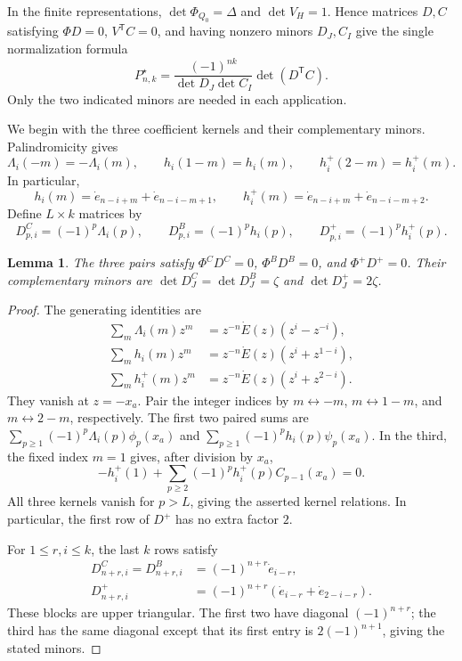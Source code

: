 \documentclass[12pt]{article}
\newtheorem{lemma}[theorem]{Lemma}
\numberwithin{equation}{section}
\newcommand{\dote}{\dot e}
\newcommand{\dotE}{\dot E}
\newcommand{\ph}{\phi}
\newcommand{\ps}{\psi}
\begin{document}
In the finite representations, $\det\Phi_{Q_0}=\Delta$ and
$\det V_H=1$.  Hence matrices $D,C$ satisfying
$\Phi D=0$, $V^{\mathsf T}C=0$, and having nonzero minors $D_J,C_I$
give the single normalization formula
\begin{equation}\label{eq:normalized-transfer}
 P^\star_{n,k}
 =\frac{(-1)^{nk}}{\det D_J\det C_I}
   \det(D^{\mathsf T}C).
\end{equation}
Only the two indicated minors are needed in each application.

We begin with the three coefficient kernels and their complementary
minors.
Palindromicity gives
\begin{equation}\label{eq:coefficient-reflections}
 \Lambda_i(-m)=-\Lambda_i(m),\qquad
 h_i(1-m)=h_i(m),\qquad h_i^+(2-m)=h_i^+(m).
\end{equation}
In particular,
\[
 h_i(m)=\dote_{n-i+m}+\dote_{n-i-m+1},\qquad
 h_i^+(m)=\dote_{n-i+m}+\dote_{n-i-m+2}.
\]
Define $L\times k$ matrices by
\begin{equation}\label{eq:D}
 D^C_{p,i}=(-1)^p\Lambda_i(p),\qquad
 D^B_{p,i}=(-1)^ph_i(p),\qquad
 D^+_{p,i}=(-1)^ph_i^+(p).
\end{equation}

\begin{lemma}\label{lem:coefficient-kernels}
The three pairs satisfy $\Phi^C D^C=0$, $\Phi^B D^B=0$, and
$\Phi^+D^+=0$.  Their complementary minors are
$\det D^C_J=\det D^B_J=\zeta$ and $\det D^+_J=2\zeta$.
\end{lemma}

\begin{proof}
The generating identities are
\begin{align*}
 \sum_m\Lambda_i(m)z^m&=z^{-n}\dotE(z)(z^i-z^{-i}),\\
 \sum_m h_i(m)z^m&=z^{-n}\dotE(z)(z^i+z^{1-i}),\\
 \sum_m h_i^+(m)z^m&=z^{-n}\dotE(z)(z^i+z^{2-i}).
\end{align*}
They vanish at $z=-x_a$.  Pair the integer indices by
$m\leftrightarrow-m$, $m\leftrightarrow1-m$, and
$m\leftrightarrow2-m$, respectively.  The first two paired sums are
$\sum_{p\ge1}(-1)^p\Lambda_i(p)\ph_p(x_a)$ and
$\sum_{p\ge1}(-1)^ph_i(p)\ps_p(x_a)$.
In the third, the fixed index $m=1$ gives, after division by $x_a$,
\[
 -h_i^+(1)+\sum_{p\ge2}(-1)^ph_i^+(p)C_{p-1}(x_a)=0.
\]
All three kernels vanish for $p>L$, giving the asserted kernel
relations.  In particular, the first row of $D^+$ has no extra factor $2$.

For $1\le r,i\le k$, the last $k$ rows satisfy
\begin{align*}
 D^C_{n+r,i}=D^B_{n+r,i}&=(-1)^{n+r}\dote_{i-r},\\
 D^+_{n+r,i}&=(-1)^{n+r}
       (\dote_{i-r}+\dote_{2-i-r}).
\end{align*}
These blocks are upper triangular.  The first two have diagonal
$(-1)^{n+r}$; the third has the same diagonal except that its first
entry is $2(-1)^{n+1}$, giving the stated minors.
\end{proof}
\end{document}
